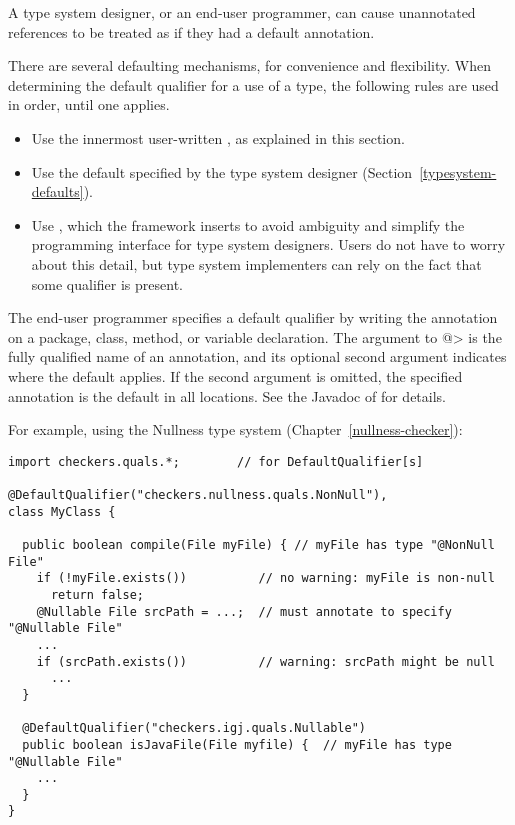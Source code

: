 A type system designer, or an end-user programmer, can cause unannotated
references to be treated as if they had a default annotation.

There are several defaulting mechanisms, for convenience and flexibility.
When determining the default qualifier for a use of a type, the following
rules are used in order, until one applies.
\begin{itemize}
\item
  Use the innermost user-written , as explained in
  this section.
\item
  Use the default specified by the type system designer
  (Section~\ref{typesystem-defaults}).
\item
  Use , which the framework
  inserts to avoid ambiguity and simplify the programming interface for
  type system designers.  Users do not have to worry about this detail,
  but type system implementers can rely on the fact that some
  qualifier is present.
\end{itemize}



The end-user programmer specifies a default qualifier by writing the 
annotation on a package, class, method, or variable declaration.  The
argument to \<@> is the fully qualified  name of an
annotation, and its optional second argument indicates where the default
applies.  If the second argument is omitted, the specified annotation is
the default in all locations.  See the Javadoc of  for details.

For example, using the Nullness type system (Chapter~\ref{nullness-checker}):

\begin{Verbatim}
import checkers.quals.*;        // for DefaultQualifier[s]

@DefaultQualifier("checkers.nullness.quals.NonNull"),
class MyClass {

  public boolean compile(File myFile) { // myFile has type "@NonNull File"
    if (!myFile.exists())          // no warning: myFile is non-null
      return false;
    @Nullable File srcPath = ...;  // must annotate to specify "@Nullable File"
    ...
    if (srcPath.exists())          // warning: srcPath might be null
      ...
  }

  @DefaultQualifier("checkers.igj.quals.Nullable")
  public boolean isJavaFile(File myfile) {  // myFile has type "@Nullable File"
    ...
  }
}
\end{Verbatim}

